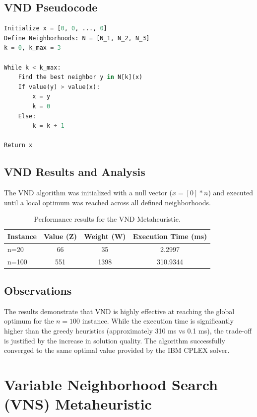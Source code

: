 \documentclass[11pt,a4paper]{article}
\begin{document}
\subsection{VND Pseudocode}
\begin{lstlisting}[language=Python, numbers=none, frame=none]
Initialize x = [0, 0, ..., 0]
Define Neighborhoods: N = [N_1, N_2, N_3]
k = 0, k_max = 3

While k < k_max:
    Find the best neighbor y in N[k](x)
    If value(y) > value(x):
        x = y
        k = 0
    Else:
        k = k + 1

Return x
\end{lstlisting}

\subsection{VND Results and Analysis}
The VND algorithm was initialized with a null vector ($x = [0]*n$) and executed until a local optimum was reached across all defined neighborhoods.

\begin{table}[htbp]
    \centering
    \begin{tabular}{|l|c|c|c|}
        \hline
        \textbf{Instance} & \textbf{Value (Z)} & \textbf{Weight (W)} & \textbf{Execution Time (ms)} \\
        \hline
        n=20  & 66  & 35   & 2.2997 \\
        \hline
        n=100 & 551 & 1398 & 310.9344 \\
        \hline
    \end{tabular}
    \caption{Performance results for the VND Metaheuristic.}
    \label{tab:vnd_results}
\end{table}

\subsection{Observations}
The results demonstrate that VND is highly effective at reaching the global optimum for the $n=100$ instance. While the execution time is significantly higher than the greedy heuristics (approximately 310 ms vs 0.1 ms), the trade-off is justified by the increase in solution quality. The algorithm successfully converged to the same optimal value provided by the IBM CPLEX solver.

\section{Variable Neighborhood Search (VNS) Metaheuristic}
\end{document}
